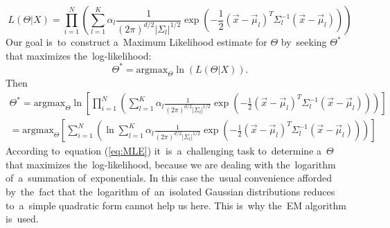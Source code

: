   \begin{equation}
    L(\Theta|X)=\prod_{i=1}^N\left( \sum_{l=1}^K\alpha_l\frac{1}{(2\pi)^{d/2}|\Sigma_l|^{1/2}}\exp{\left(-\frac{1}{2}(\overrightarrow{x}-\overrightarrow{\mu}_l)^T\Sigma_l^{-1}(\overrightarrow{x}-\overrightarrow{\mu}_l)\right)} \right)
  \end{equation}
Our goal is~to~construct a~Maximum Likelihood estimate for $\Theta$ by~seeking $\Theta^*$ that maximizes the~log-likelihood:
\begin{equation}
 \Theta^*=\textrm{argmax}_{\Theta}\ln(L(\Theta|X)).
\end{equation}
Then 
\begin{align}
  \Theta^*=\textrm{argmax}_{\Theta}\ln\left[\prod_{i=1}^N\left( \sum_{l=1}^K\alpha_l\frac{1}{(2\pi)^{d/2}|\Sigma_l|^{1/2}}\exp{\left(-\frac{1}{2}(\overrightarrow{x}-\overrightarrow{\mu}_l)^T\Sigma_l^{-1}(\overrightarrow{x}-\overrightarrow{\mu}_l)\right)} \right)\right]\nonumber
  \\
  =\textrm{argmax}_{\Theta}\left[\sum_{i=1}^N\left(\ln \sum_{l=1}^K\alpha_l\frac{1}{(2\pi)^{d/2}|\Sigma_l|^{1/2}}\exp{\left(-\frac{1}{2}(\overrightarrow{x}-\overrightarrow{\mu}_l)^T\Sigma_l^{-1}(\overrightarrow{x}-\overrightarrow{\mu}_l)\right)} \right)\right]
  \label{eq:MLE}
\end{align}
According to~equation (\ref{eq:MLE}) it~is~a~challenging task to~determine a~$\Theta$ that maximizes the~log-likelihood, because we are dealing with the~logarithm of~a~summation of~exponentials. In this case the~usual convenience afforded by~the~fact that the~logarithm of~an~isolated Gaussian distributions reduces to~a~simple quadratic form cannot help us here. This is~why the~EM algorithm is~used.



